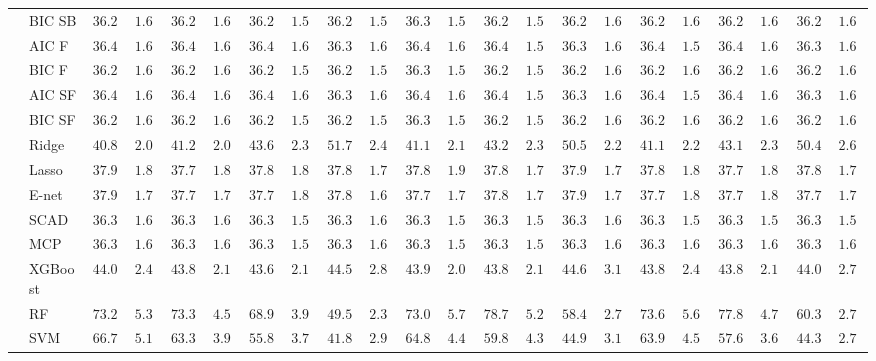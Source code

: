 \begin{tabular}{llllllllllllllllllllll}
	& BIC SB  & $36.28$ & $1.60$ & $36.26$ & $1.62$ & $36.28$ & $1.59$ & $36.26$ & $1.59$ & $36.30$ & $1.58$ & $36.29$ & $1.58$ & $36.29$ & $1.61$ & $36.29$ & $1.60$ & $36.28$ & $1.60$ & $36.28$ & $1.61$ \\
	& AIC F  & $36.41$ & $1.60$ & $36.41$ & $1.61$ & $36.40$ & $1.60$ & $36.39$ & $1.61$ & $36.41$ & $1.60$ & $36.41$ & $1.59$ & $36.37$ & $1.60$ & $36.40$ & $1.59$ & $36.40$ & $1.61$ & $36.39$ & $1.61$ \\
	& BIC F  & $36.28$ & $1.60$ & $36.26$ & $1.62$ & $36.28$ & $1.59$ & $36.26$ & $1.59$ & $36.30$ & $1.58$ & $36.28$ & $1.59$ & $36.28$ & $1.62$ & $36.29$ & $1.60$ & $36.28$ & $1.60$ & $36.28$ & $1.61$ \\
	& AIC SF  & $36.41$ & $1.60$ & $36.41$ & $1.61$ & $36.40$ & $1.60$ & $36.39$ & $1.61$ & $36.41$ & $1.60$ & $36.41$ & $1.59$ & $36.37$ & $1.60$ & $36.40$ & $1.59$ & $36.40$ & $1.61$ & $36.39$ & $1.61$ \\
	& BIC SF  & $36.28$ & $1.60$ & $36.26$ & $1.62$ & $36.28$ & $1.59$ & $36.26$ & $1.59$ & $36.30$ & $1.58$ & $36.28$ & $1.59$ & $36.28$ & $1.62$ & $36.29$ & $1.60$ & $36.28$ & $1.60$ & $36.28$ & $1.61$ \\
	& Ridge  & $40.85$ & $2.02$ & $41.21$ & $2.02$ & $43.66$ & $2.34$ & $51.70$ & $2.49$ & $41.15$ & $2.18$ & $43.27$ & $2.36$ & $50.50$ & $2.23$ & $41.19$ & $2.21$ & $43.13$ & $2.37$ & $50.49$ & $2.66$ \\
	& Lasso  & $37.99$ & $1.80$ & $37.77$ & $1.81$ & $37.82$ & $1.88$ & $37.89$ & $1.77$ & $37.85$ & $1.90$ & $37.85$ & $1.78$ & $37.99$ & $1.76$ & $37.83$ & $1.86$ & $37.76$ & $1.88$ & $37.81$ & $1.75$ \\
	& E-net  & $37.93$ & $1.76$ & $37.73$ & $1.75$ & $37.76$ & $1.82$ & $37.82$ & $1.68$ & $37.78$ & $1.78$ & $37.81$ & $1.78$ & $37.95$ & $1.72$ & $37.77$ & $1.83$ & $37.73$ & $1.85$ & $37.78$ & $1.74$ \\
	& SCAD  & $36.31$ & $1.60$ & $36.31$ & $1.61$ & $36.32$ & $1.58$ & $36.32$ & $1.60$ & $36.30$ & $1.58$ & $36.34$ & $1.58$ & $36.34$ & $1.61$ & $36.32$ & $1.59$ & $36.33$ & $1.59$ & $36.33$ & $1.59$ \\
	& MCP  & $36.33$ & $1.62$ & $36.31$ & $1.61$ & $36.32$ & $1.59$ & $36.30$ & $1.63$ & $36.32$ & $1.57$ & $36.32$ & $1.57$ & $36.33$ & $1.61$ & $36.33$ & $1.60$ & $36.33$ & $1.60$ & $36.34$ & $1.60$ \\
	& XGBoost  & $44.06$ & $2.40$ & $43.89$ & $2.11$ & $43.61$ & $2.18$ & $44.52$ & $2.85$ & $43.94$ & $2.08$ & $43.87$ & $2.18$ & $44.68$ & $3.13$ & $43.86$ & $2.42$ & $43.88$ & $2.17$ & $44.06$ & $2.77$ \\
	& RF  & $73.27$ & $5.35$ & $73.37$ & $4.50$ & $68.90$ & $3.97$ & $49.51$ & $2.33$ & $73.02$ & $5.72$ & $78.72$ & $5.21$ & $58.40$ & $2.75$ & $73.60$ & $5.60$ & $77.88$ & $4.72$ & $60.38$ & $2.71$ \\
	& SVM  & $66.76$ & $5.12$ & $63.36$ & $3.98$ & $55.88$ & $3.75$ & $41.80$ & $2.98$ & $64.85$ & $4.47$ & $59.86$ & $4.36$ & $44.94$ & $3.12$ & $63.99$ & $4.57$ & $57.67$ & $3.69$ & $44.39$ & $2.74$ \\
	\hline 
\end{tabular}